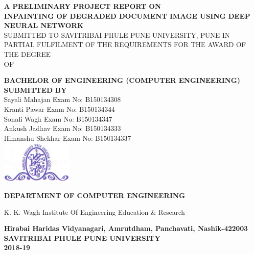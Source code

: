 \documentclass[oneside,a4paper,12pt]{report}
\begin{document}
\setlength{\parindent}{0mm}
\begin{center}
{\bfseries A PRELIMINARY PROJECT REPORT ON  \\}
 \vspace*{1\baselineskip}
{\bfseries INPAINTING OF DEGRADED DOCUMENT IMAGE USING 
DEEP NEURAL NETWORK \\}
 \vspace*{1\baselineskip}
{\fontsize{12}{12} \selectfont SUBMITTED TO SAVITRIBAI PHULE PUNE UNIVERSITY, PUNE IN PARTIAL FULFILMENT OF THE REQUIREMENTS FOR THE AWARD OF THE DEGREE \\ 
OF
\vspace*{1\baselineskip}}

{\bfseries \fontsize{16}{12} \selectfont BACHELOR OF ENGINEERING (COMPUTER ENGINEERING) \\
\vspace*{1\baselineskip}} 
{\bfseries \fontsize{12}{12} \selectfont SUBMITTED BY \\ 
\vspace*{1\baselineskip}} 
 Sayali Mahajan\hspace{25 mm} Exam No: B150134308 \\ 
 Kranti Pawar \hspace{25 mm}  Exam No: B150134344 \\  
 Sonali Wagh  \hspace{25 mm}  Exam No: B150134347 \\
 Ankush Jadhav\hspace{25 mm}  Exam No: B150134333 \\
 Himanshu Shekhar\hspace{25 mm}  Exam No: B150134337 \\
\vspace*{2\baselineskip}
\includegraphics[width=100pt]{collegelogo.png} \\
{\bfseries \fontsize{16}{12} \selectfont DEPARTMENT OF COMPUTER ENGINEERING \\ 
 \vspace*{1\baselineskip}

K. K. Wagh Institute Of Engineering Education \& Research\\ 
}
 \vspace*{1\baselineskip}
{\bfseries \fontsize{12}{12} \selectfont 
Hirabai Haridas Vidyanagari, Amrutdham, Panchavati, Nashik-422003 
\vspace*{1\baselineskip}}
{\bfseries \fontsize{12}{12} \selectfont 
SAVITRIBAI PHULE PUNE UNIVERSITY\\
2018-19
}
\end{center}
\end{document}
